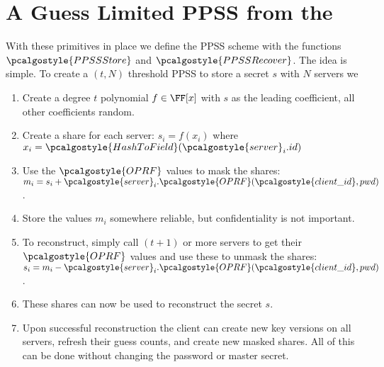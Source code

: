 \documentclass{article}
\newcommand{\OPRF}{\pcalgostyle{OPRF}}
\newcommand{\PPSSStore}{\pcalgostyle{PPSSStore}}
\newcommand{\PPSSRecover}{\pcalgostyle{PPSSRecover}}
\newcommand{\HashToField}{\pcalgostyle{HashToField}}
\newcommand{\clientid}{\pcalgostyle{client\_id}}
\newcommand{\server}{\pcalgostyle{server}}
\begin{document}
\section{A Guess Limited PPSS from the \OPRF}
\label{sec:ppss}
With these primitives in place we define the PPSS scheme with the functions
$\PPSSStore$ and $\PPSSRecover$. The idea is simple. To create a $(t,N)$
threshold PPSS to store a secret $s$ with $N$ servers we 
\begin{enumerate}
    \item Create a degree $t$ polynomial $f\in\FF[x]$ with $s$ as the leading
    coefficient, all other coefficients random.
    \item Create a share for each server: $s_i = f(x_i)$ where $x_i =
    \HashToField(\server_{i}.id)$
    \item Use the $\OPRF$ values to mask the shares: $m_i = s_i +
    \server_i.\OPRF(\clientid, pwd)$.
    \item Store the values $m_i$ somewhere reliable, but confidentiality is not
    important.
    \item To reconstruct, simply call $(t+1)$ or more servers to get their
    $\OPRF$ values and use these to unmask the shares: $s_i = m_i -
    \server_i.\OPRF(\clientid, pwd)$.
    \item These shares can now be used to reconstruct the secret $s$.
    \item Upon successful reconstruction the client can create new key versions
    on all servers, refresh their guess counts, and create new masked shares.
    All of this can be done without changing the password or master secret.
\end{enumerate}
\end{document}
